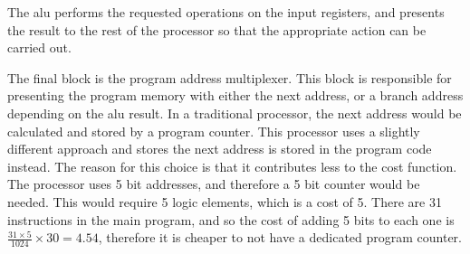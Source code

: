 The \gls{alu} performs the requested operations on the input registers, and presents the result to the rest of the processor so that the appropriate action can be carried out.

The final block is the program address multiplexer. This block is responsible for presenting the program memory with either the next address, or a branch address depending on the \gls{alu} result. In a traditional processor, the next address would be calculated and stored by a program counter. This processor uses a slightly different approach and stores the next address is stored in the program code instead. The reason for this choice is that it contributes less to the cost function. The processor uses 5 bit addresses, and therefore a 5 bit counter would be needed. This would require 5 logic elements, which is a cost of 5. There are 31 instructions in the main program, and so the cost of adding 5 bits to each one is $\frac{31 \times 5}{1024}\times 30 = 4.54$, therefore it is cheaper to not have a dedicated program counter.

